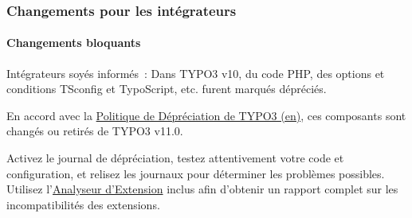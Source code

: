 %

\begin{frame}[fragile]
	\frametitle{Changements pour les intégrateurs}
	\framesubtitle{Changements bloquants}

	\small
		Intégrateurs soyés informés~: Dans TYPO3 v10, du code PHP, des options et conditions
		TSconfig et TypoScript, etc. furent marqués dépréciés.

		\vspace{0.2cm}

		En accord avec la
		\href{https://typo3.org/article/typo3-deprecation-policy}{Politique de Dépréciation de TYPO3 (en)},
		ces composants sont changés ou retirés de TYPO3 v11.0.

		\vspace{0.2cm}

		Activez le journal de dépréciation, testez attentivement votre code et configuration, et
		relisez les journaux pour déterminer les problèmes possibles. Utilisez
		l'\href{https://docs.typo3.org/m/typo3/reference-coreapi/master/en-us/ApiOverview/ExtensionScanner/Index.html}{Analyseur d'Extension}
		inclus afin d'obtenir un rapport complet sur les incompatibilités des extensions.

	\normalsize

\end{frame}

